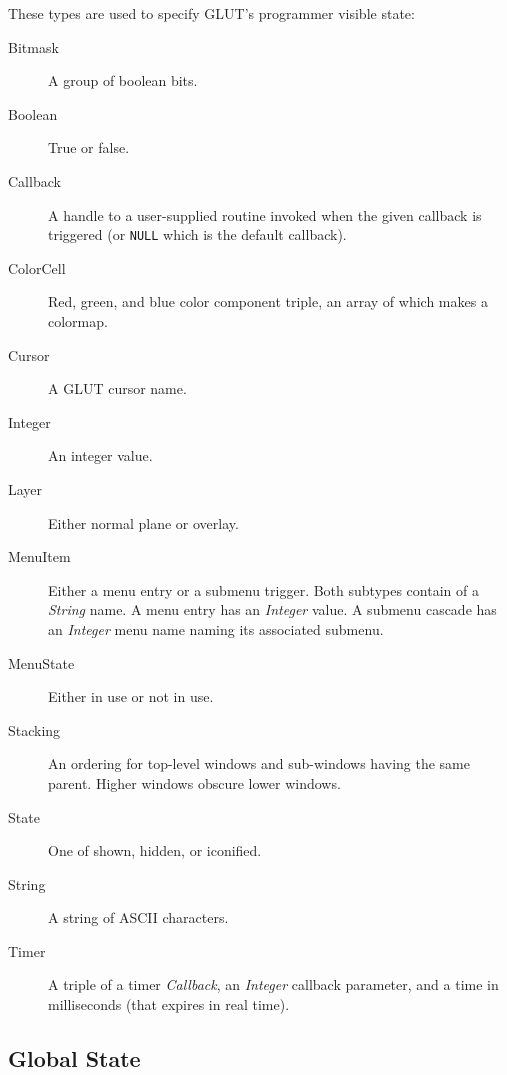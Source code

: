 These types are used to specify GLUT's programmer visible state:
\begin{description}

\item[Bitmask]
A group of boolean bits.

\item[Boolean]
True or false.

\item[Callback]
A handle to a user-supplied routine invoked when the given callback is triggered
(or {\tt NULL} which is the default callback).

\item[ColorCell]
Red, green, and blue color component triple, an array of which makes
a colormap.

\item[Cursor]
A GLUT cursor name.

\item[Integer]
An integer value.

\item[Layer]
Either normal plane or overlay.

\item[MenuItem]
Either a menu entry or a submenu trigger.  Both subtypes contain
of a {\em String} name.  A menu entry has an {\em Integer} value.  A
submenu cascade has an {\em Integer} menu name naming its associated submenu.

\item[MenuState]
Either in use or not in use.

\item[Stacking]
An ordering for top-level windows and sub-windows having the same
parent.  Higher windows obscure lower windows.

\item[State]
One of shown, hidden, or iconified.

\item[String]
A string of ASCII characters.

\item[Timer]
A triple of a timer {\em Callback}, an {\em Integer} callback parameter, and a time
in milliseconds (that expires in real time).

\end{description}

\subsection{Global State}

